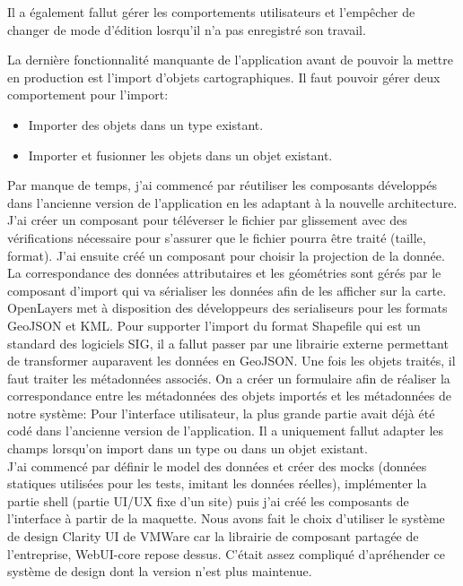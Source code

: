 \documentclass{rapportUHA40}
\begin{document}
Il a également fallut gérer les comportements utilisateurs et l'empêcher de
changer de mode d'édition losrqu'il n'a pas enregistré son travail.

La dernière fonctionnalité manquante de l'application avant de pouvoir la
mettre en production est l'import d'objets cartographiques. Il faut pouvoir
gérer deux comportement pour l'import:
\begin{itemize}
  \item Importer des objets dans un type existant.
  \item Importer et fusionner les objets dans un objet existant.
\end{itemize}

Par manque de temps, j'ai commencé par réutiliser les composants développés
dans l'ancienne version de l'application en les adaptant à la nouvelle
architecture. J'ai créer un composant pour téléverser le fichier par glissement
avec des vérifications nécessaire pour s'assurer que le fichier pourra être
traité (taille, format). J'ai ensuite créé un composant pour choisir la
projection de la donnée. La correspondance des données attributaires et les
géométries sont gérés par le composant d'import qui va sérialiser les données
afin de les afficher sur la carte. OpenLayers met à disposition des
développeurs des serialiseurs pour les formats GeoJSON et KML\@. Pour supporter
l'import du format Shapefile qui est un standard des logiciels SIG, il a fallut
passer par une librairie externe permettant de transformer auparavent les
données en GeoJSON\@. Une fois les objets traités, il faut traiter les
métadonnées associés. On a créer un formulaire afin de réaliser la
correspondance entre les métadonnées des objets importés et les métadonnées de
notre système:  Pour l'interface
utilisateur, la plus grande partie avait déjà été codé dans l'ancienne version
de l'application. Il a uniquement fallut adapter les champs lorsqu'on import
dans un type ou dans un objet existant. \\

J'ai commencé par définir le model des données et créer des mocks (données
statiques utilisées pour les tests, imitant les données réelles), implémenter
la partie shell (partie UI/UX fixe d'un site) puis j'ai créé les composants de
l'interface à partir de la maquette. Nous avons fait le choix d'utiliser le
système de design Clarity UI de VMWare car la librairie de composant partagée
de l'entreprise, WebUI-core repose dessus. C'était assez compliqué d'apréhender
ce système de design dont la version n'est plus maintenue.
\end{document}
